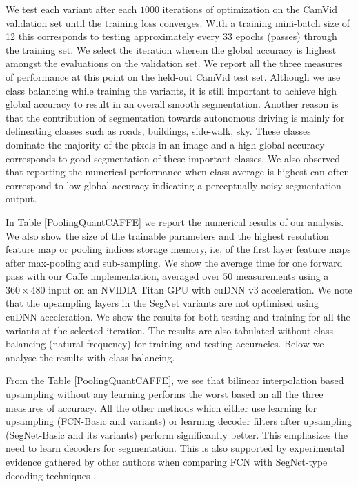 We test each variant after each $1000$ iterations of optimization on the CamVid validation set until the training loss converges. With a training mini-batch size of 12 this corresponds to testing approximately every 33 epochs (passes) through the training set. We select the iteration wherein the global accuracy is highest amongst the evaluations on the validation set. We report all the three measures of performance at this point on the held-out CamVid test set. Although we use class balancing while training the variants, it is still important to achieve high global accuracy to result in an overall smooth segmentation. Another reason is that the contribution of segmentation towards autonomous driving is mainly for delineating classes such as roads, buildings, side-walk, sky. These classes dominate the majority of the pixels in an image and a high global accuracy corresponds to good segmentation of these important classes. We also observed that reporting the numerical performance when class average is highest can often correspond to low global accuracy indicating a perceptually noisy segmentation output.

In Table \ref{PoolingQuantCAFFE} we report the numerical results of our analysis. We also show the size of the trainable parameters and the highest resolution feature map or pooling indices storage memory, i.e, of the first layer feature maps after max-pooling and sub-sampling. We show the average time for one forward pass with our Caffe implementation, averaged over $50$ measurements using a $360\times480$ input on an NVIDIA Titan GPU with cuDNN v3 acceleration. We note that the upsampling layers in the SegNet variants are not optimised using cuDNN acceleration. We show the results for both testing and training for all the variants at the selected iteration. The results are also tabulated without class balancing (natural frequency) for training and testing accuracies. Below we analyse the results with class balancing.

From the Table \ref{PoolingQuantCAFFE}, we see that bilinear interpolation based upsampling without any learning performs the worst based on all the three measures of accuracy. All the other methods which either use learning for upsampling (FCN-Basic and variants) or learning decoder filters after upsampling (SegNet-Basic and its variants) perform significantly better. This emphasizes the need to learn decoders for segmentation. This is also supported by experimental evidence gathered by other authors when comparing FCN with SegNet-type decoding techniques \citep{NohDeconvNets}.

